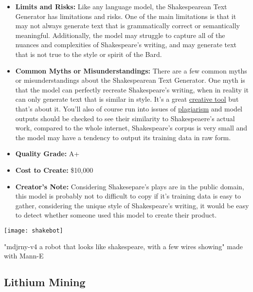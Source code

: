 \begin{itemize}
\begin{enumerate}
        \end{enumerate}
\item \textbf{Limits and Risks:} Like any language model, the Shakespearean Text Generator has limitations and risks. One of the main limitations is that it may not always generate text that is grammatically correct or semantically meaningful. Additionally, the model may struggle to capture all of the nuances and complexities of Shakespeare's writing, and may generate text that is not true to the style or spirit of the Bard.
\item \textbf{Common Myths or Misunderstandings:}
There are a few common myths or misunderstandings about the Shakespearean Text Generator. One myth is that the model can perfectly recreate Shakespeare's writing, when in reality it can only generate text that is similar in style. It's a great \hyperref[sec:creative]{creative tool} but that's about it. You'll also of course run into issues of \hyperref[sec:plag]{plagiarism} and model outputs should be checked to see their similarity to Shakespeaere's actual work, compared to the whole internet, Shakespeare's corpus is very small and the model may have a tendency to output its training data in raw form.
    \item \textbf{Quality Grade:} A+
    \item \textbf{Cost to Create:} \$10,000
    \item \textbf{Creator's Note:} Considering Shakesepare's plays are in the public domain, this model is probably not to difficult to copy if it's training data is easy to gather, considering the unique style of Shakespeare's writing, it would be easy to detect whether someone used this model to create their product.
\end{itemize}

\begin{marginfigure}[-5.5cm]
        \texttt{[image: shakebot]}
        \caption{"mdjrny-v4 a robot that looks like shakespeare, with a few wires showing" made with Mann-E}
\end{marginfigure}

\subsection{Lithium Mining}

